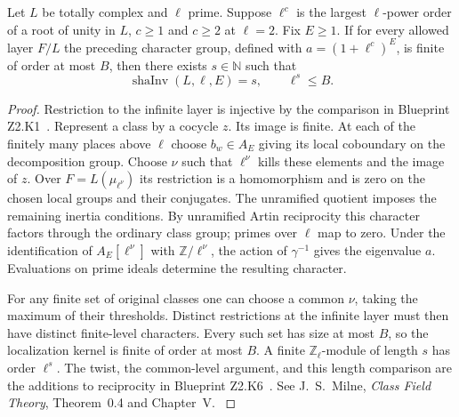 \begin{theorem}\label{pn:P037}
Let \(L\) be totally complex and \(\ell\) prime. Suppose \(\ell^c\)
is the largest \(\ell\)-power order of a root of unity in \(L\),
\(c\ge1\) and \(c\ge2\) at \(\ell=2\). Fix \(E\ge1\). If for every
allowed layer \(F/L\) the preceding character group, defined with
\(a=(1+\ell^c)^E\), is finite of order at most \(B\), then there
exists \(s\in\mathbb N\) such that
\[
 \operatorname{shaInv}(L,\ell,E)=s,\qquad \ell^s\le B .
\]
\end{theorem}
\begin{proof}
Restriction to the infinite layer is injective by the comparison in
Blueprint Z2.K1~. Represent a class by a cocycle \(z\). Its image
is finite. At each of the finitely many places above \(\ell\)
choose \(b_w\in A_E\) giving its local coboundary on the decomposition
group. Choose \(\nu\) such that \(\ell^\nu\) kills these elements
and the image of \(z\). Over \(F=L(\mu_{\ell^\nu})\) its restriction
is a homomorphism and is zero on the chosen local groups and their
conjugates. The unramified quotient imposes the remaining inertia
conditions. By unramified Artin reciprocity this character factors
through the ordinary class group; primes over \(\ell\) map to zero.
Under the identification of \(A_E[\ell^\nu]\) with \(\mathbb Z/\ell^\nu\),
the action of \(\gamma^{-1}\) gives the eigenvalue \(a\). Evaluations
on prime ideals determine the resulting character.

For any finite set of original classes one can choose a common
\(\nu\), taking the maximum of their thresholds. Distinct restrictions
at the infinite layer must then have distinct finite-level characters.
Every such set has size at most \(B\), so the localization kernel is
finite of order at most \(B\). A finite \(\mathbb Z_\ell\)-module of
length \(s\) has order \(\ell^s\). The twist, the common-level
argument, and this length comparison are the additions to reciprocity
in Blueprint Z2.K6~. See J.~S.~Milne, \emph{Class Field Theory},
Theorem~0.4 and Chapter~V. \cite{r21-cft}
\end{proof}
